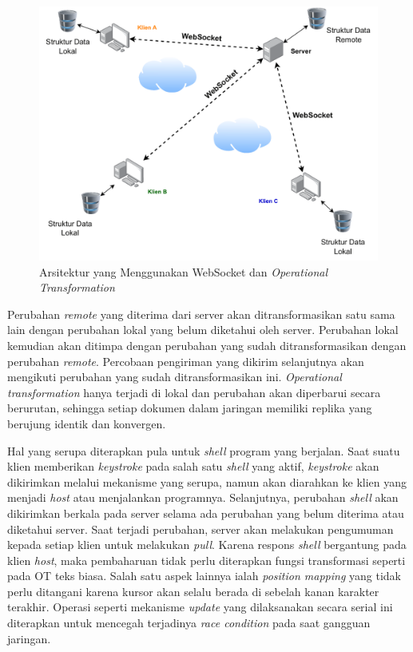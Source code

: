 \begin{figure}
    \centering
    \includegraphics[scale=0.65]{assets/skripsi/Arsitektur_WebSocket_OT}
    \caption{Arsitektur yang Menggunakan WebSocket dan \textit{Operational Transformation}}
    \label{fig:websocket_ot}
\end{figure}

Perubahan \textit{remote} yang diterima dari server akan ditransformasikan satu sama lain dengan perubahan lokal yang belum diketahui oleh server. Perubahan lokal kemudian akan ditimpa dengan perubahan yang sudah ditransformasikan dengan perubahan \textit{remote}. Percobaan pengiriman yang dikirim selanjutnya akan mengikuti perubahan yang sudah ditransformasikan ini. \textit{Operational transformation} hanya terjadi di lokal dan perubahan akan diperbarui secara berurutan, sehingga setiap dokumen dalam jaringan memiliki replika yang berujung identik dan konvergen.

Hal yang serupa diterapkan pula untuk \textit{shell} program yang berjalan. Saat suatu klien memberikan \textit{keystroke} pada salah satu \textit{shell} yang aktif, \textit{keystroke} akan dikirimkan melalui mekanisme yang serupa, namun akan diarahkan ke klien yang menjadi \textit{host} atau menjalankan programnya. Selanjutnya, perubahan \textit{shell} akan dikirimkan berkala pada server selama ada perubahan yang belum diterima atau diketahui server. Saat terjadi perubahan, server akan melakukan pengumuman kepada setiap klien untuk melakukan \textit{pull}. Karena respons \textit{shell} bergantung pada klien \textit{host}, maka pembaharuan tidak perlu diterapkan fungsi transformasi seperti pada OT teks biasa. Salah satu aspek lainnya ialah \textit{position mapping} yang tidak perlu ditangani karena kursor akan selalu berada di sebelah kanan karakter terakhir. Operasi seperti mekanisme \textit{update} yang dilaksanakan secara serial ini diterapkan untuk mencegah terjadinya \textit{race condition} pada saat gangguan jaringan.

